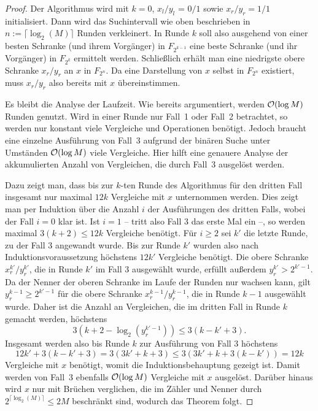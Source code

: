 \begin{proof}
 	Der Algorithmus wird mit $k=0$, $x_l/y_l$ = $0/1$ sowie $x_r/y_r = 1/1$ initialisiert.
 	Dann wird das Suchintervall wie oben beschrieben in $n:=\lceil \log_2(M) \rceil$ Runden verkleinert.
 	In Runde $k$ soll also ausgehend von einer besten Schranke (und ihrem Vorgänger) in $F_{2^{k-1}}$ eine beste Schranke (und ihr Vorgänger) in $F_{2^k}$ ermittelt werden.
 	Schließlich erhält man eine niedrigste obere Schranke $x_r/y_r$ an $x$ in $F_{2^n}$.
 	Da eine Darstellung von $x$ selbst in $F_{2^n}$ existiert, muss $x_r/y_r$ also bereits mit $x$ übereinstimmen.
 	
 	Es bleibt die Analyse der Laufzeit.
 	Wie bereits argumentiert, werden $\mathcal{O}(\log M)$ Runden genutzt.
 	Wird in einer Runde nur Fall~1 oder Fall~2 betrachtet, so werden nur konstant viele Vergleiche und Operationen benötigt.
 	Jedoch braucht eine einzelne Ausführung von Fall~3 aufgrund der binären Suche unter Umständen $\mathcal{O}(\log M)$ viele Vergleiche.
 	Hier hilft eine genauere Analyse der akkumulierten Anzahl von Vergleichen, die durch Fall~3 ausgelöst werden.
 	
 	Dazu zeigt man, dass bis zur $k$-ten Runde des Algorithmus für den dritten Fall insgesamt nur maximal $12k$ Vergleiche mit $x$ unternommen werden.
 	Dies zeigt man per Induktion über die Anzahl $i$ der Ausführungen des dritten Falls, wobei der Fall $i=0$ klar ist.
 	Ist $i=1$ -- tritt also Fall 3 das erste Mal ein --, so werden maximal $3(k+2) \leq 12k$ Vergleiche benötigt.
 	Für $i\geq2$ sei $k'$ die letzte Runde, zu der Fall 3 angewandt wurde.
 	Bis zur Runde $k'$ wurden also nach Induktionsvoraussetzung höchstens $12k'$ Vergleiche benötigt.
 	Die obere Schranke $x_r^{k'} / y_r^{k'}$, die in Runde $k'$ im Fall $3$ ausgewählt wurde,  erfüllt außerdem $y_r^{k'} > 2^{k'-1}$.
 	Da der Nenner der oberen Schranke im Laufe der Runden nur wachsen kann, gilt $y_r^{k - 1} \geq 2^{k'-1}$ für die obere Schranke $x_r^{k-1}/y_r^{k-1}$, die in Runde $k-1$ ausgewählt wurde.
 	Daher ist die Anzahl an Vergleichen, die im dritten Fall in Runde $k$ gemacht werden, höchstens \[
 	3(k+2-\log_2(y_r^{k' - 1}))\leq 3(k - k' + 3).
 	\]
 	Insgesamt werden also bis Runde $k$ zur Ausführung von Fall 3 höchstens \[
 	12k' + 3(k-k'+3) = 3(3k' + k + 3) \leq 3(3k' + k + 3(k-k')) = 12 k
 	\]
 	Vergleiche mit $x$ benötigt, womit die Induktionsbehauptung gezeigt ist.
 	Damit werden von Fall~3 ebenfalls $\mathcal{O}(\log M)$ Vergleiche mit $x$ ausgelöst.
 	Darüber hinaus wird $x$ nur mit Brüchen verglichen, die im Zähler und Nenner durch $2^{\lceil \log_2(M) \rceil}\leq 2M$ beschränkt sind, wodurch das Theorem folgt.
 \end{proof}

